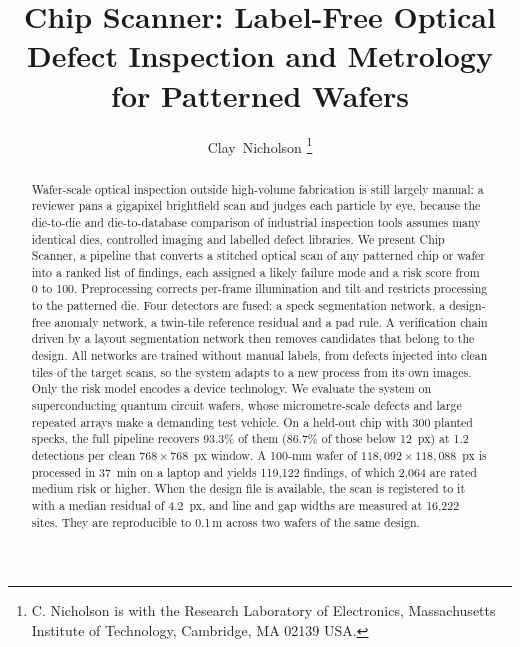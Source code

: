 \documentclass[journal]{IEEEtran}
\newcommand{\um}{\,\textmu m}
\begin{document}
\title{Chip Scanner: Label-Free Optical Defect Inspection and Metrology for Patterned Wafers}

\author{Clay~Nicholson%
\thanks{C. Nicholson is with the Research Laboratory of Electronics, Massachusetts Institute of Technology, Cambridge, MA 02139 USA.}}


\maketitle

\begin{abstract}
Wafer-scale optical inspection outside high-volume fabrication is still largely manual: a reviewer pans a gigapixel brightfield scan and judges each particle by eye, because the die-to-die and die-to-database comparison of industrial inspection tools assumes many identical dies, controlled imaging and labelled defect libraries. We present Chip Scanner, a pipeline that converts a stitched optical scan of any patterned chip or wafer into a ranked list of findings, each assigned a likely failure mode and a risk score from 0 to 100. Preprocessing corrects per-frame illumination and tilt and restricts processing to the patterned die. Four detectors are fused: a speck segmentation network, a design-free anomaly network, a twin-tile reference residual and a pad rule. A verification chain driven by a layout segmentation network then removes candidates that belong to the design. All networks are trained without manual labels, from defects injected into clean tiles of the target scans, so the system adapts to a new process from its own images. Only the risk model encodes a device technology. We evaluate the system on superconducting quantum circuit wafers, whose micrometre-scale defects and large repeated arrays make a demanding test vehicle. On a held-out chip with 300 planted specks, the full pipeline recovers 93.3\% of them (86.7\% of those below 12~px) at 1.2 detections per clean $768 \times 768$~px window. A 100-mm wafer of $118{,}092 \times 118{,}088$~px is processed in 37~min on a laptop and yields 119{,}122 findings, of which 2{,}064 are rated medium risk or higher. When the design file is available, the scan is registered to it with a median residual of 4.2~px, and line and gap widths are measured at 16{,}222 sites. They are reproducible to 0.1\um{} across two wafers of the same design.
\end{abstract}
\end{document}
